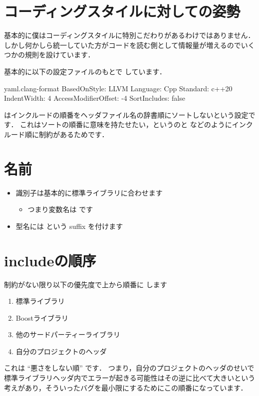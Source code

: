 \documentclass[lualatex,a4paper,ja=standard]{bxjsarticle}
\begin{document}


\section{コーディングスタイルに対しての姿勢}

\par 基本的に僕はコーディングスタイルに特別こだわりがあるわけではありません．
しかし何かしら統一していた方がコードを読む側として情報量が増えるのでいくつかの規則を設けています．

\par 基本的に以下の設定ファイルのもとで  しています．
\begin{program}[linenos]{yaml}{.clang-format}
  BasedOnStyle: LLVM
  Language: Cpp
  Standard: c++20
  IndentWidth: 4
  AccessModifierOffset: -4
  SortIncludes: false
\end{program}

\par {} はインクルードの順番をヘッダファイル名の辞書順にソートしないという設定です．
これはソートの順番に意味を持たせたい，というのと  などのようにインクルード順に制約があるためです．

\section{名前}

\begin{itemize}
  \item 識別子は基本的に標準ライブラリに合わせます
        \begin{itemize}
          \item つまり変数名は  です
        \end{itemize}
  \item 型名には  という suffix を付けます
\end{itemize}

\section{includeの順序}

\par 制約がない限り以下の優先度で上から順番に  します
\begin{enumerate}
  \item 標準ライブラリ
  \item Boostライブラリ
  \item 他のサードパーティーライブラリ
  \item 自分のプロジェクトのヘッダ
\end{enumerate}

\par これは ``悪さをしない順'' です．
つまり，自分のプロジェクトのヘッダのせいで標準ライブラリヘッダ内でエラーが起きる可能性はその逆に比べて大きいという考えがあり，そういったバグを最小限にするためにこの順番になっています．

\renewcommand{\bibname}{参考文献}
\printbibliography
\end{document}
